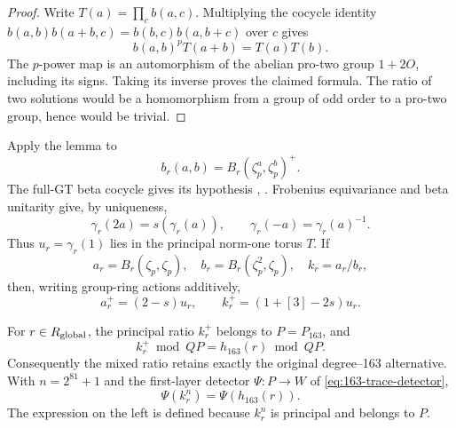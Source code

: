 \begin{proof}
Write \(T(a)=\prod_c b(a,c)\).  Multiplying the cocycle identity
\(b(a,b)b(a+b,c)=b(b,c)b(a,b+c)\) over \(c\) gives
\[
 b(a,b)^p T(a+b)=T(a)T(b).
\]
The \(p\)-power map is an automorphism of the abelian pro-two
group \(1+2O\), including its signs.  Taking its inverse proves
the claimed formula.  The ratio of two solutions would be a
homomorphism from a group of odd order to a pro-two group, hence
would be trivial.
\end{proof}

Apply the lemma to
\[
 b_r(a,b)=B_r(\zeta_p^a,\zeta_p^b)^+.
\]
The full-GT beta cocycle gives its hypothesis
\cite[Proposition~1.6.1]{Ihara1999},
\cite[Section~2.3, p.~101]{Furusho2003}. Frobenius
equivariance and beta unitarity give, by uniqueness,
\[
 \gamma_r(2a)=s(\gamma_r(a)),\qquad
 \gamma_r(-a)=\gamma_r(a)^{-1}.
\]
Thus \(u_r=\gamma_r(1)\) lies in the principal norm-one torus
\(T\).  If
\[
 a_r=B_r(\zeta_p,\zeta_p),\quad
 b_r=B_r(\zeta_p^2,\zeta_p),\quad
 k_r=a_r/b_r,
\]
then, writing group-ring actions additively,
\begin{equation}
 a_r^+=(2-s)u_r,
 \qquad k_r^+=(1+[3]-2s)u_r.                 \label{eq:163-gamma-beta-ratios}
\end{equation}

\begin{proposition}
\label{prop:163-mixed-beta-residual}
For \(r\in R_{\rm global}\), the principal ratio \(k_r^+\)
belongs to \(P=P_{163}\), and
\[
 k_r^+\bmod QP=h_{163}(r)\bmod QP.
\]
Consequently the mixed ratio retains exactly the original
degree--163 alternative.  With \(n=2^{81}+1\) and the
first-layer detector \(\Psi:P\to W\) of
\eqref{eq:163-trace-detector},
\begin{equation}
 \Psi(k_r^n)=\Psi(h_{163}(r)).               \label{eq:163-mixed-ratio-detector}
\end{equation}
The expression on the left is defined because \(k_r^n\) is
principal and belongs to \(P\).
\end{proposition}

